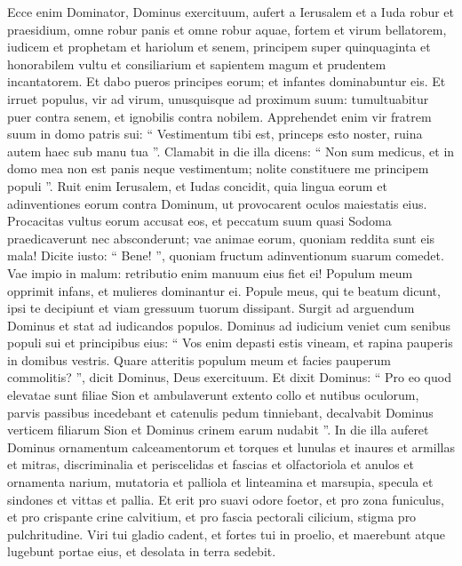 \begin{biblechapter}
\begin{biblechapter}
\begin{biblechapter}
\verse Ecce enim Dominator, Dominus exercituum,
 aufert a Ierusalem et a Iuda robur et praesidium,
 omne robur panis et omne robur aquae,
 \verse fortem et virum bellatorem,
 iudicem et prophetam et hariolum et senem,
 \verse principem super quinquaginta et honorabilem vultu
 et consiliarium et sapientem magum
 et prudentem incantatorem.
 \verse Et dabo pueros principes eorum;
 et infantes dominabuntur eis.
 \verse Et irruet populus, vir ad virum,
 unusquisque ad proximum suum:
 tumultuabitur puer contra senem,
 et ignobilis contra nobilem.
 \verse Apprehendet enim vir fratrem suum
 in domo patris sui:
 “ Vestimentum tibi est,
 princeps esto noster,
 ruina autem haec sub manu tua ”.
 \verse Clamabit in die illa dicens:
 “ Non sum medicus,
 et in domo mea non est panis neque vestimentum;
 nolite constituere me principem populi ”.
 \verse Ruit enim Ierusalem, et Iudas concidit,
 quia lingua eorum et adinventiones eorum contra Dominum,
 ut provocarent oculos maiestatis eius.
 \verse Procacitas vultus eorum accusat eos,
 et peccatum suum quasi Sodoma
 praedicaverunt nec absconderunt;
 vae animae eorum,
 quoniam reddita sunt eis mala!
 \verse Dicite iusto: “ Bene! ”,
 quoniam fructum adinventionum suarum comedet.
 \verse Vae impio in malum:
 retributio enim manuum eius fiet ei!
 \verse Populum meum opprimit infans,
 et mulieres dominantur ei.
 Popule meus, qui te beatum dicunt, ipsi te decipiunt
 et viam gressuum tuorum dissipant.
 \verse Surgit ad arguendum Dominus
 et stat ad iudicandos populos.
 \verse Dominus ad iudicium veniet
 cum senibus populi sui et principibus eius:
 “ Vos enim depasti estis vineam,
 et rapina pauperis in domibus vestris.
 \verse Quare atteritis populum meum
 et facies pauperum commolitis? ”,
 dicit Dominus, Deus exercituum.
 \verse Et dixit Dominus:
 “ Pro eo quod elevatae sunt filiae Sion
 et ambulaverunt extento collo et nutibus oculorum,
 parvis passibus incedebant
 et catenulis pedum tinniebant,
 \verse decalvabit Dominus verticem filiarum Sion
 et Dominus crinem earum nudabit ”.
 \verse In die illa auferet Dominus
 ornamentum calceamentorum et torques
 \verse et lunulas et inaures
 et armillas et mitras,
 \verse discriminalia et periscelidas
 et fascias et olfactoriola
 \verse et anulos et ornamenta narium,
 \verse mutatoria et palliola
 et linteamina et marsupia,
 \verse specula et sindones
 et vittas et pallia.
 \verse Et erit pro suavi odore foetor,
 et pro zona funiculus,
 et pro crispante crine calvitium,
 et pro fascia pectorali cilicium,
 stigma pro pulchritudine.
 \verse Viri tui gladio cadent,
 et fortes tui in proelio,
 \verse et maerebunt atque lugebunt portae eius,
 et desolata in terra sedebit.
 

\end{biblechapter}
\end{biblechapter}
\end{biblechapter}
